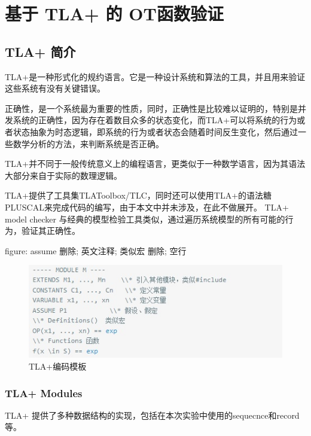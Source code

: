 \chapter{基于 TLA+ 的 OT函数验证} 
\section{TLA+ 简介}
\par TLA+是一种形式化的规约语言。它是一种设计系统和算法的工具，并且用来验证这些系统有没有关键错误。
\par 正确性，是一个系统最为重要的性质，同时，正确性是比较难以证明的，特别是并发系统的正确性，因为存在着数目众多的状态变化，而TLA+可以将系统的行为或者状态抽象为时态逻辑，即系统的行为或者状态会随着时间反生变化，然后通过一些数学分析的方法，来判断系统是否正确。

\par TLA+并不同于一般传统意义上的编程语言，更类似于一种数学语言，因为其语法大部分来自于实际的数理逻辑。
\par TLA+提供了工具集TLAToolbox/TLC，同时还可以使用TLA+的语法糖PLUSCAL来完成代码的编写，由于本文中并未涉及，在此不做展开。
TLA+ model checker 与经典的模型检验工具类似，通过遍历系统模型的所有可能的行为，验证其正确性。

figure: assume 删除; 英文注释; 类似宏 删除; 空行

\begin{figure}
\centering
\includegraphics{figures/module.jpg}
\caption{TLA+编码模板}
\label{fig:graph}
\end{figure}

\subsection{TLA+ Modules}
TLA+ 提供了多种数据结构的实现，包括在本次实验中使用的sequecnce和record等。

